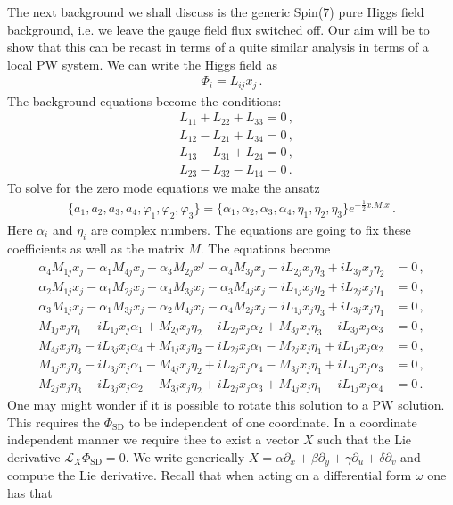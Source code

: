 \documentclass[12pt]{article}%
\numberwithin{equation}{section}
\newcommand{\al}[1]{\begin{align}#1\end{align}}
\newcommand{\p}{\partial}
\renewcommand{\(}{\left(}
\renewcommand{\)}{\right)}
\renewcommand{\[}{\left[}
\renewcommand{\]}{\right]}
\begin{document}
The next background we shall discuss is the generic Spin(7) pure Higgs field background, i.e.
we leave the gauge field flux switched off. Our aim will be to show that this can be recast in terms of a
quite similar analysis in terms of a local PW system. We can write the Higgs field as
%
\al{ \Phi_i = L_{ij} x_j\,.
}
%
The background equations become the conditions:
%
\al{ &L_{11}+L_{22}+L_{33} = 0\,,\\
&L_{12}-L_{21}+L_{34} = 0\,,\\
&L_{13}-L_{31}+L_{24}=0\,,\\
&L_{23}-L_{32}-L_{14} =0\,.
}
%
To solve for the zero mode equations we make the ansatz
%
\al{ \{ a_1,a_2,a_3,a_4,\varphi_1,\varphi_2,\varphi_3\} = \{\alpha_1,\alpha_2,\alpha_3,\alpha_4,\eta_1,\eta_2,\eta_3\} e^{-\frac{1}{2} x.M.x}\,.
}
%
Here $\alpha_i $ and $\eta_i$ are complex numbers. The equations are going to fix these coefficients as well as the matrix $M$. The equations become
%
\al{ \alpha_4 M_{1j} x_j -\alpha_1 M_{4j} x_j +\alpha_3 M_{2j} x^j- \alpha_4 M_{3j}x_j -i L_{2j}x_j \eta_3 +i L_{3j}x_j \eta_2 &=0\,,\\
\alpha_2 M_{1j} x_j -\alpha_1 M_{2j}x_j +\alpha_4 M_{3j}x_j-\alpha_3 M_{4j}x_j -i L_{1j}x_j \eta_2 +i L_{2j} x_j \eta_1&=0\,,\\
\alpha_3 M_{1j} x_j - \alpha_1 M_{3j} x_j+\alpha_2 M_{4j} x_j -\alpha_4 M_{2j} x_j -i L_{1j} x_j \eta_3 +i L_{3j} x_j\eta_1&=0\,,\\
 M_{1j} x_j \eta_1 -i L_{1j} x_j \alpha_1 + M_{2j} x_j \eta_2 -i L_{2j} x_j \alpha_2 + M_{3j} x_j \eta_3 -i L_{3j}x_j \alpha_3&=0\,,\\
M_{4j} x_j \eta_3 -i L_{3j}x_j \alpha_4 + M_{1j} x_j \eta_2 -i L_{2j}x_j \alpha_1 - M_{2j} x_j \eta_1 +i L_{1j} x_j \alpha_2 &=0\,,\\
M_{1j} x_j \eta_3 -i L_{3j} x_j \alpha_1 - M_{4j}x_j \eta_2 +i L_{2j} x_j \alpha_4 -M_{3j}x_j \eta_1 +i L_{1j} x_j \alpha_3 &=0\,,\\
M_{2j} x_j \eta_3 -i L_{3j} x_j \alpha_2 -M_{3j} x_j \eta_2 +i L_{2j} x_j \alpha_3 + M_{4j} x_j \eta_1 -i L_{1j} x_j \alpha_4 &=0\,.
}
%
One may might wonder if it is possible to rotate this solution to a PW solution. This requires the $\Phi_{\text{SD}}$ to be independent of one coordinate. In a coordinate independent manner we require thee to exist a vector $X$ such that the Lie derivative $\mathcal L_X \Phi_{\text{SD}} = 0$. We write generically $X = \alpha \p_x + \beta \p_y + \gamma \p_u + \delta \p_v$ and compute the Lie derivative. Recall that when acting on a differential form $\omega$ one has that
\end{document}
